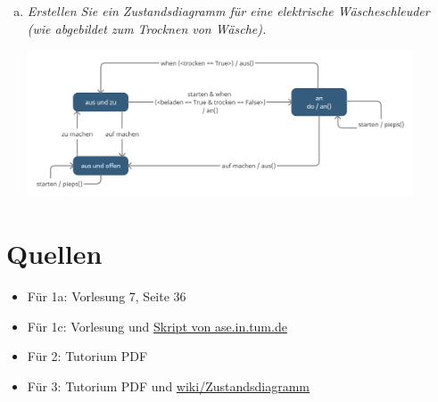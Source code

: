 \begin{enumerate}[(a)]
    \item \itshape{ Erstellen Sie ein Zustandsdiagramm für eine elektrische Wäscheschleuder (wie abgebildet zum Trocknen von Wäsche).}
    \begin{itemize}
        \includegraphics[width=0.9\textwidth]{src/u6/U6_3b.png}
    \end{itemize} 


\end{enumerate}


\section{Quellen}
\begin{itemize}
    \item Für 1a: Vorlesung 7, Seite 36
    \item Für 1c: Vorlesung und \href{https://ase.in.tum.de/lehrstuhl_1/files/teaching/Lehrstuhl/Informatik2SoSe2004/S04_01_UML.pdf}{Skript von ase.in.tum.de}
    \item Für 2: Tutorium PDF
    \item Für 3: Tutorium PDF und \href{https://de.wikipedia.org/wiki/Zustandsdiagramm_(UML)#Innere_Transitionen_und_%C3%A4u%C3%9Fere_Transitionen}{wiki/Zustandsdiagramm}
\end{itemize}


